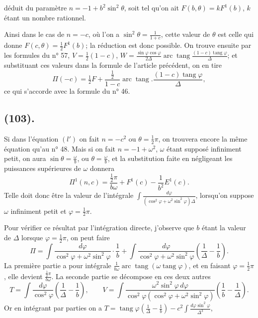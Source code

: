 \documentclass{article}
\begin{document}
déduit du paramètre $n=-1+b^{2}\sin^{2}\theta$, soit tel qu'on ait $F(b,\theta)=kF^{1}(b)$, $k$ étant un nombre rationnel.

Ainsi dans le cas de $n=-c$, où l'on a $\sin^{2}\theta=\frac{1}{1+c}$, cette valeur de $\theta$ est celle qui donne $F(c,\theta)=\frac{1}{2}F^{1}(b)$; la réduction est donc possible. On trouve ensuite par les formules du n° 57, $V=\frac{1}{2}(1-c)$, $W=\frac{\sin\varphi\cos\varphi}{2\Delta}\operatorname{arc}\operatorname{tang}\frac{(1-c)\operatorname{tang}\varphi}{\Delta}$; et substituant ces valeurs dans la formule de l'article précédent, on en tire
\[ \Pi(-c)=\tfrac{1}{2}F+\frac{\frac{1}{2}}{1-c}\operatorname{arc}\operatorname{tang}.\frac{(1-c)\operatorname{tang}\varphi}{\Delta}, \]
ce qui s'accorde avec la formule du n° 46.

\subsection*{(103).}

Si dans l'équation $(l')$ on fait $n=-c^{2}$ ou $\theta=\frac{1}{2}\pi$, on trouvera encore la même équation qu'au n° 48. Mais si on fait $n=-1+\omega^{2}$, $\omega$ étant supposé infiniment petit, on aura $\sin\theta=\frac{\omega}{b}$, ou $\theta=\frac{\omega}{b}$, et la substitution faite en négligeant les puissances supérieures de $\omega$ donnera
\[ \Pi^{1}(n,c)=\frac{\frac{1}{2}\pi}{b\omega}+F^{1}(c)-\frac{1}{b^{2}}E^{1}(c). \]
Telle doit donc être la valeur de l'intégrale $\displaystyle\int\frac{d\varphi}{(\cos^{2}\varphi+\omega^{2}\sin^{2}\varphi)\Delta}$, lorsqu'on suppose $\omega$ infiniment petit et $\varphi=\frac{1}{2}\pi$.

Pour vérifier ce résultat par l'intégration directe, j'observe que $b$ étant la valeur de $\Delta$ lorsque $\varphi=\frac{1}{2}\pi$, on peut faire
\[ \Pi=\int\frac{d\varphi}{\cos^{2}\varphi+\omega^{2}\sin^{2}\varphi}\cdot\frac{1}{b}+\int\frac{d\varphi}{\cos^{2}\varphi+\omega^{2}\sin^{2}\varphi}\left(\frac{1}{\Delta}-\frac{1}{b}\right). \]
La première partie a pour intégrale $\frac{1}{b\omega}\operatorname{arc}\operatorname{tang}(\omega\operatorname{tang}\varphi)$, et en faisant $\varphi=\frac{1}{2}\pi$, elle devient $\frac{\frac{1}{2}\pi}{b\omega}$. La seconde partie se décompose en ces deux autres
\[ T=\int\frac{d\varphi}{\cos^{2}\varphi}\left(\frac{1}{\Delta}-\frac{1}{b}\right),\qquad V=\int\frac{\omega^{2}\sin^{2}\varphi\,d\varphi}{\cos^{2}\varphi(\cos^{2}\varphi+\omega^{2}\sin^{2}\varphi)}\left(\frac{1}{b}-\frac{1}{\Delta}\right). \]
Or en intégrant par parties on a $T=\operatorname{tang}\varphi\left(\frac{1}{\Delta}-\frac{1}{b}\right)-c^{2}\displaystyle\int\frac{d\varphi\sin^{2}\varphi}{\Delta^{3}}$,
\end{document}
